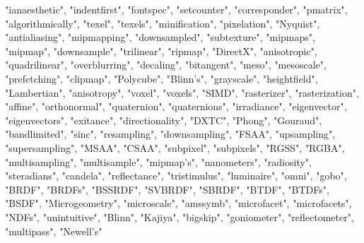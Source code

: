 "ianaesthetic",
"indentfirst",
"fontspec",
"setcounter",
"corresponder",
"pmatrix",
"algorithmically",
"texel",
"texels",
"minification", 
"pixelation", 
"Nyquist", 
"antialiasing",
"mipmapping", 
"downsampled",
"subtexture",
"mipmaps",
"mipmap",
"downsample",
"trilinear", 
"ripmap",
"DirectX",
"anisotropic",
"quadrilinear",
"overblurring",
"decaling",
"bitangent", 
"meso",
"mesoscale", 
"prefetching",
"clipmap",
"Polycube",
"Blinn's",
"grayscale",
"heightfield",
"Lambertian",
"anisotropy",
"voxel",
"voxels",
"SIMD",
"rasterizer",
"rasterization",
"affine",
"orthonormal",
"quaternion",
"quaternions",
"irradiance",
"eigenvector",
"eigenvectors",
"exitance",
"directionality",
"DXTC",
"Phong",
"Gouraud",
"bandlimited",
"sinc",
"resampling",
"downsampling",
"FSAA",
"upsampling",
"supersampling",
"MSAA",
"CSAA",
"subpixel", 
"subpixels", 
"RGSS",
"RGBA",
"multisampling",
"multisample",
"mipmap's",
"nanometers",
"radiosity",
"steradians",
"candela",
"reflectance",
"tristimulus",
"luminaire",
"omni",
"gobo",
"BRDF",
"BRDFs",
"BSSRDF", 
"SVBRDF",
"SBRDF",
"BTDF",
"BTDFs",
"BSDF",
"Microgeometry",
"microscale",
"amssymb",
"microfacet",
"microfacets",
"NDFs",
"unintuitive",
"Blinn",
"Kajiya",
"bigskip",
"goniometer",
"reflectometer",
"multipass",
"Newell's"